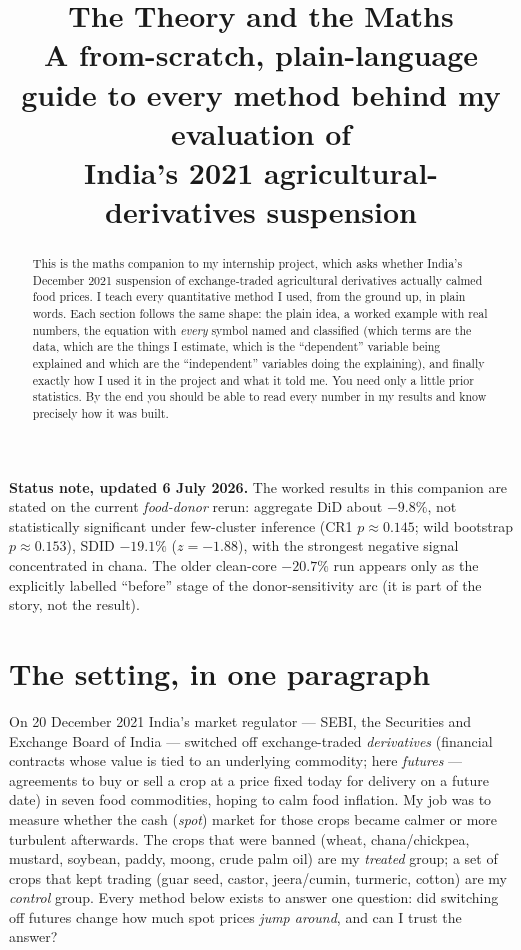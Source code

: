 \documentclass[11pt]{article}
\title{\textbf{The Theory and the Maths}\\[4pt]
\large A from-scratch, plain-language guide to every method behind my evaluation of\\
India's 2021 agricultural-derivatives suspension}
\author{}
\date{}
\begin{document}
\maketitle

\noindent\textbf{Status note, updated 6 July 2026.} The worked results in this companion are
stated on the current \emph{food-donor} rerun: aggregate DiD about $-9.8\%$, not statistically
significant under few-cluster inference (CR1 $p \approx 0.145$; wild bootstrap $p \approx 0.153$),
SDID $-19.1\%$ ($z=-1.88$), with the strongest negative signal concentrated in chana. The older
clean-core $-20.7\%$ run appears only as the explicitly labelled ``before'' stage of the
donor-sensitivity arc (it is part of the story, not the result).

\begin{abstract}
\noindent This is the maths companion to my internship project, which asks whether India's
December 2021 suspension of exchange-traded agricultural derivatives actually calmed food
prices. I teach every quantitative method I used, from the ground up, in plain words. Each
section follows the same shape: the plain idea, a worked example with real numbers, the
equation with \emph{every} symbol named and classified (which terms are the data, which are
the things I estimate, which is the ``dependent'' variable being explained and which are the
``independent'' variables doing the explaining), and finally exactly how I used it in the
project and what it told me. You need only a little prior statistics. By the end you should be
able to read every number in my results and know precisely how it was built.
\end{abstract}

\tableofcontents
\bigskip

\section{The setting, in one paragraph}

On 20 December 2021 India's market regulator --- SEBI, the Securities and Exchange Board of
India --- switched off exchange-traded \emph{derivatives} (financial contracts whose value is
tied to an underlying commodity; here \emph{futures} --- agreements to buy or sell a crop at a
price fixed today for delivery on a future date) in seven food commodities, hoping to calm food
inflation. My job was to measure whether the cash (\emph{spot}) market for those crops became
calmer or more turbulent afterwards. The crops that were banned (wheat, chana/chickpea, mustard,
soybean, paddy, moong, crude palm oil) are my \emph{treated} group; a set of crops that kept
trading (guar seed, castor, jeera/cumin, turmeric, cotton) are my \emph{control} group. Every
method below exists to answer one question: did switching off futures change how much spot
prices \emph{jump around}, and can I trust the answer?
\end{document}
